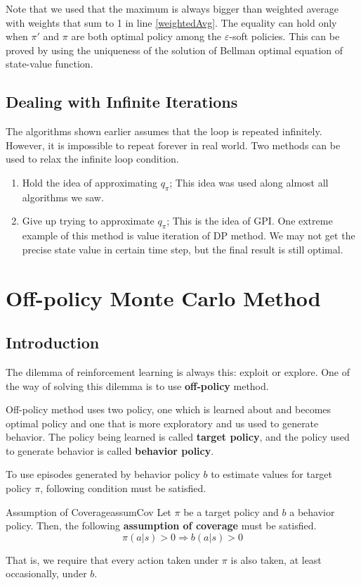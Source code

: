 \documentclass[../../main.tex]{subfiles}
\begin{document}
            Note that we used that the maximum is always bigger than weighted average with weights that sum to 1 in line \ref{weightedAvg}.
            The equality can hold only when $\pi'$ and $\pi$ are both optimal policy among the $\varepsilon$-soft policies. This can be proved by using the
            uniqueness of the solution of Bellman optimal equation of state-value function.

    \subsection{Dealing with Infinite Iterations}
        The algorithms shown earlier assumes that the loop is repeated infinitely. However, it is impossible to repeat
        forever in real world. Two methods can be used to relax the infinite loop condition.
        \begin{enumerate}
            \item Hold the idea of approximating $q_\pi$; This idea was used along almost all algorithms we saw.
            \item Give up trying to approximate $q_\pi$; This is the idea of GPI. One extreme example of this method is value iteration of DP method.
                We may not get the precise state value in certain time step, but the final result is still optimal.
        \end{enumerate}
\section{Off-policy Monte Carlo Method}
    \subsection{Introduction}
        The dilemma of reinforcement learning is always this: exploit or explore. One of the way of solving this dilemma is to use \textbf{off-policy} method.
        
        Off-policy method uses two policy, one which is learned about and becomes optimal policy and one that is more exploratory and us used to generate behavior.
        The policy being learned is called \textbf{target policy}, and the policy used to generate behavior is called \textbf{behavior policy}.

        To use episodes generated by behavior policy $b$ to estimate values for target policy $\pi$, following condition must be satisfied.
        \begin{defn}{Assumption of Coverage}{assumCov}
            Let $\pi$ be a target policy and $b$ a behavior policy. Then, the following \textbf{assumption of coverage} must be satisfied.
            \begin{equation}
                \pi(a|s) > 0 \Rightarrow b(a|s) > 0
            \end{equation}
        \end{defn}
        That is, we require that every action taken under $\pi$ is also taken, at least occasionally, under $b$.
\end{document}
